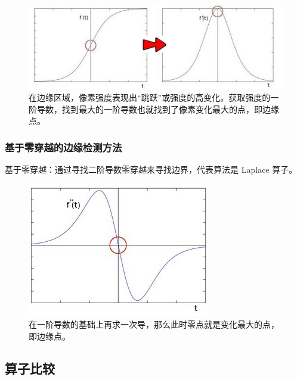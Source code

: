 \documentclass[letterpaper,10pt]{article}
\begin{document}
			\begin{figure}[htbp]
				\centering 
				\includegraphics[width=0.7\columnwidth]{picture/LLIE/first-order derivative}
				\caption{
					\label{fig: first-order derivative} 
					在边缘区域，像素强度表现出“跳跃”或强度的高变化。获取强度的一阶导数，找到最大的一阶导数也就找到了像素变化最大的点，即边缘点。
				}
			\end{figure}
			
			\subsubsection{基于零穿越的边缘检测方法}
			
			基于零穿越：通过寻找二阶导数零穿越来寻找边界，代表算法是 Laplace 算子。
			
			\begin{figure}[htbp]
				\centering 
				\includegraphics[width=0.6\columnwidth]{picture/LLIE/second-order derivative}
				\caption{
					\label{fig: second-order derivative} 
					在一阶导数的基础上再求一次导，那么此时零点就是变化最大的点，即边缘点。
				}
			\end{figure}
		
		\subsection{算子比较}
		
\end{document}

